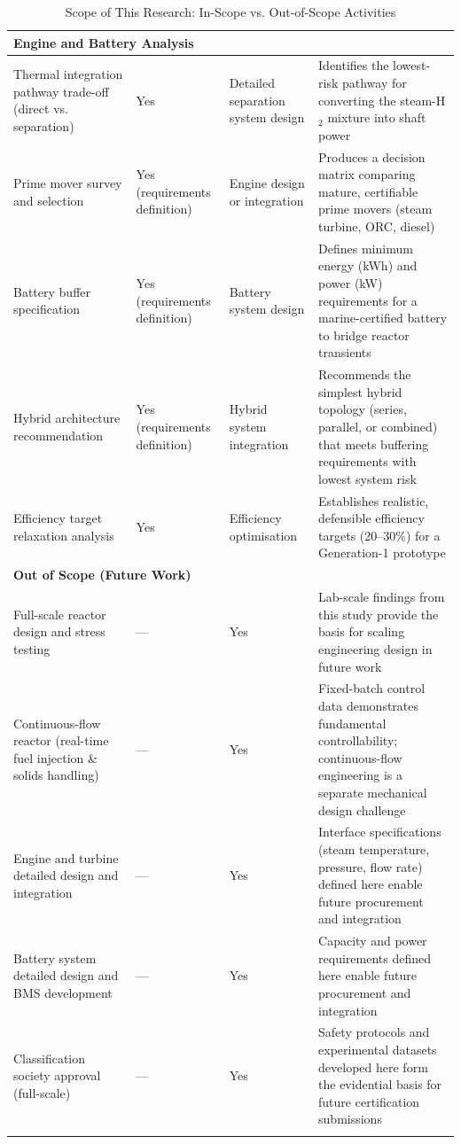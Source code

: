 \documentclass[12pt]{article}
\begin{document}
\begin{longtable}{|p{3.5cm}|p{1.8cm}|p{1.8cm}|p{7.2cm}|}
\multicolumn{4}{|l|}{\textbf{Engine and Battery Analysis}} \\
\hline
Thermal integration pathway trade-off (direct vs. separation) &
Yes & Detailed separation system design &
Identifies the lowest-risk pathway for converting the steam-H$_2$ mixture into shaft power \\
\hline
Prime mover survey and selection &
Yes (requirements definition) & Engine design or integration &
Produces a decision matrix comparing mature, certifiable prime movers (steam turbine, ORC, diesel) \\
\hline
Battery buffer specification &
Yes (requirements definition) & Battery system design &
Defines minimum energy (kWh) and power (kW) requirements for a marine-certified battery to bridge reactor transients \\
\hline
Hybrid architecture recommendation &
Yes (requirements definition) & Hybrid system integration &
Recommends the simplest hybrid topology (series, parallel, or combined) that meets buffering requirements with lowest system risk \\
\hline
Efficiency target relaxation analysis &
Yes & Efficiency optimisation &
Establishes realistic, defensible efficiency targets (20--30\%) for a Generation-1 prototype \\
\hline

\multicolumn{4}{|l|}{\textbf{Out of Scope (Future Work)}} \\
\hline
Full-scale reactor design and stress testing &
--- & Yes &
Lab-scale findings from this study provide the basis for scaling engineering design in future work \\
\hline
Continuous-flow reactor (real-time fuel injection \& solids handling) &
--- & Yes &
Fixed-batch control data demonstrates fundamental controllability; continuous-flow engineering is a separate mechanical design challenge \\
\hline
Engine and turbine detailed design and integration &
--- & Yes &
Interface specifications (steam temperature, pressure, flow rate) defined here enable future procurement and integration \\
\hline
Battery system detailed design and BMS development &
--- & Yes &
Capacity and power requirements defined here enable future procurement and integration \\
\hline
Classification society approval (full-scale) &
--- & Yes &
Safety protocols and experimental datasets developed here form the evidential basis for future certification submissions \\
\hline

\caption{Scope of This Research: In-Scope vs. Out-of-Scope Activities}
\label{tab:scope-full}
\end{longtable}
\end{document}
